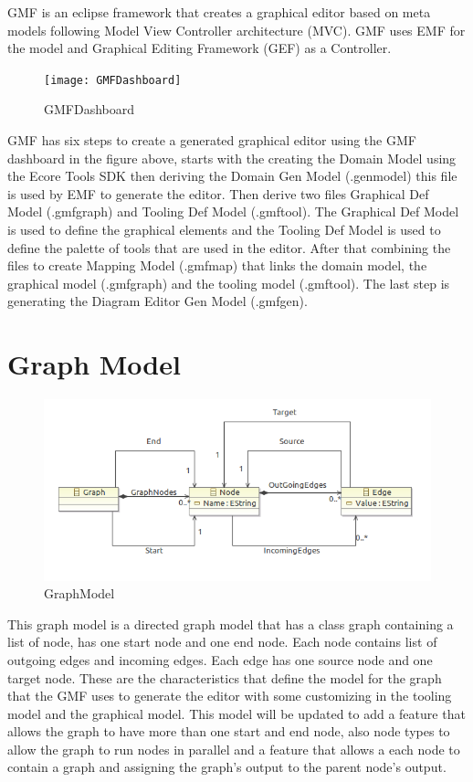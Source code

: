 \documentclass[a4paper]{article}
\begin{document}
GMF is an eclipse framework that creates a graphical editor based on meta models following Model View Controller architecture (MVC). GMF uses EMF for the model and Graphical Editing Framework (GEF) as a Controller. 

\begin{figure}[htp]
\centering
\texttt{[image: GMFDashboard]}
\caption{GMFDashboard}
\label{GMFDashboard}
\end{figure}

GMF has six steps to create a generated graphical editor using the GMF dashboard in the figure above, starts with the creating the Domain Model using the Ecore Tools SDK then deriving the Domain Gen Model (.genmodel) this file is used by EMF to generate the editor. Then derive two files Graphical Def Model (.gmfgraph) and Tooling Def Model (.gmftool). The  Graphical Def Model is used to define the graphical elements and the Tooling Def Model is used to define the palette of tools that are used in the editor. After that combining the files to create Mapping Model (.gmfmap) that links the domain model, the graphical model (.gmfgraph) and the tooling model (.gmftool). The last step is generating the Diagram Editor Gen Model (.gmfgen).


\section{Graph Model}

\begin{figure}[htp]
\centering
\includegraphics[width=0.8\linewidth]{GraphModel}
\caption{GraphModel}
\label{GraphModel}
\end{figure}

This graph model is a directed graph model that has a class graph containing a list of node, has one start node and one end node. Each node contains list of outgoing edges and incoming edges. Each edge has one source node and one target node. These are the characteristics that define the model for the graph that the GMF uses to generate the editor with some customizing in the tooling model and the graphical model. This model will be updated to add a feature that allows the graph to have more than one start and end node, also node types to allow the graph to run nodes in parallel and a feature that allows a each node to contain a graph and assigning the graph's output to the parent node's output. 
\end{document}
